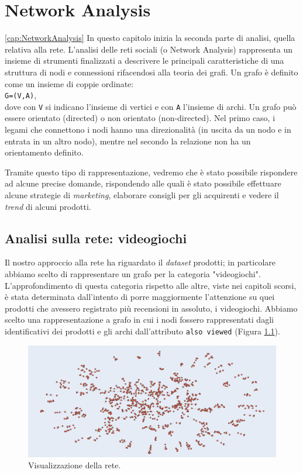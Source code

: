 \chapter{Network Analysis}
\ref{cap:NetworkAnalysis}
	In questo capitolo inizia la seconda parte di analisi, quella relativa alla rete. L’analisi delle reti sociali (o Network Analysis) rappresenta un insieme di strumenti finalizzati a descrivere le principali caratteristiche di una struttura di nodi e connessioni rifacendosi alla teoria dei grafi. Un grafo è definito come un insieme di coppie ordinate: \\
	\verb|G=(V,A)|, \\
	dove con \verb|V| si indicano l'insieme di vertici e con \verb|A| l'insieme di archi. Un grafo può essere orientato (directed) o non orientato (non-directed). Nel primo caso, i legami che connettono i nodi hanno una direzionalità (in uscita da un nodo e in entrata in un altro nodo), mentre nel secondo la relazione non ha un orientamento definito. 
	
	Tramite questo tipo di rappresentazione, vedremo che è stato possibile rispondere ad alcune precise domande, rispondendo alle quali è stato possibile effettuare alcune strategie di \textit{marketing}, elaborare consigli per gli acquirenti e vedere il \textit{trend} di alcuni prodotti.   
	
	
	\section{Analisi sulla rete: videogiochi}
		Il nostro approccio alla rete ha riguardato il \textit{dataset} prodotti; in particolare abbiamo scelto di rappresentare un grafo per la categoria "videogiochi". L'approfondimento di questa categoria rispetto alle altre, viste nei capitoli scorsi, è stata determinata dall'intento di porre maggiormente l'attenzione su quei prodotti che avessero registrato più recensioni in assoluto, i videogiochi. Abbiamo scelto una rappresentazione a grafo in cui i nodi fossero rappresentati dagli identificativi dei prodotti e gli archi dall'attributo \verb|also viewed| (Figura \ref{fig:network}).  
		
		\begin{figure} [h]
			\includegraphics[width=\textwidth]{Figure/network}
			\caption{Visualizzazione della rete.}
			\label{fig:network}
		\end{figure}
		
